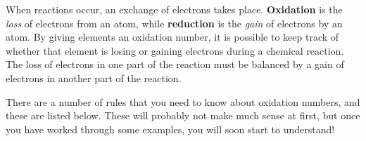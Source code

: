 When reactions occur, an exchange of electrons takes place. \textbf{Oxidation} is the \textit{loss} of electrons from an atom, while \textbf{reduction} is the \textit{gain} of electrons by an atom. By giving elements an oxidation number, it is possible to keep track of whether that element is losing or gaining electrons during a chemical reaction. The loss of electrons in one part of the reaction must be balanced by a gain of electrons in another part of the reaction.


There are a number of rules that you need to know about oxidation numbers, and these are listed below. These will probably not make much sense at first, but once you have worked through some examples, you will soon start to understand!

